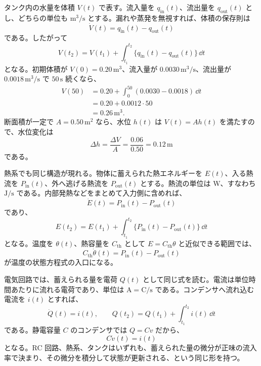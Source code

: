\begin{example}[タンクの体積保存]
タンク内の水量を体積 $V(t)$ で表す。流入量を $q_{\mathrm{in}}(t)$、流出量を $q_{\mathrm{out}}(t)$ とし、どちらの単位も $\mathrm{m^3/s}$ とする。漏れや蒸発を無視すれば、体積の保存則は
\begin{equation}
  \dot{V}(t)=q_{\mathrm{in}}(t)-q_{\mathrm{out}}(t)
\end{equation}
である。したがって
\begin{equation}
  V(t_2)=V(t_1)+
  \int_{t_1}^{t_2}
  \{q_{\mathrm{in}}(t)-q_{\mathrm{out}}(t)\}\,\dd t
\end{equation}
となる。初期体積が $V(0)=0.20\,\mathrm{m^3}$、流入量が $0.0030\,\mathrm{m^3/s}$、流出量が $0.0018\,\mathrm{m^3/s}$ で $50\,\mathrm{s}$ 続くなら、
\begin{align}
  V(50)
  &=0.20+\int_{0}^{50}(0.0030-0.0018)\,\dd t\\
  &=0.20+0.0012\cdot50\\
  &=0.26\,\mathrm{m^3}.
\end{align}
断面積が一定で $A=0.50\,\mathrm{m^2}$ なら、水位 $h(t)$ は $V(t)=Ah(t)$ を満たすので、水位変化は
\begin{equation}
  \Delta h=\frac{\Delta V}{A}
  =\frac{0.06}{0.50}
  =0.12\,\mathrm{m}
\end{equation}
である。
\end{example}

熱系でも同じ構造が現れる。物体に蓄えられた熱エネルギーを $E(t)$、入る熱流を $P_{\mathrm{in}}(t)$、外へ逃げる熱流を $P_{\mathrm{out}}(t)$ とする。熱流の単位は W、すなわち $\mathrm{J/s}$ である。内部発熱などをまとめて入力側に含めれば、
\begin{equation}
  \dot{E}(t)=P_{\mathrm{in}}(t)-P_{\mathrm{out}}(t)
\end{equation}
であり、
\begin{equation}
  E(t_2)=E(t_1)+
  \int_{t_1}^{t_2}
  \{P_{\mathrm{in}}(t)-P_{\mathrm{out}}(t)\}\,\dd t
\end{equation}
となる。温度を $\theta(t)$、熱容量を $C_{\mathrm{th}}$ として $E=C_{\mathrm{th}}\theta$ と近似できる範囲では、
\begin{equation}
  C_{\mathrm{th}}\dot{\theta}(t)
  =P_{\mathrm{in}}(t)-P_{\mathrm{out}}(t)
\end{equation}
が温度の状態方程式の入口になる。

電気回路では、蓄えられる量を電荷 $Q(t)$ として同じ式を読む。電流は単位時間あたりに流れる電荷であり、単位は $\mathrm{A}=\mathrm{C/s}$ である。コンデンサへ流れ込む電流を $i(t)$ とすれば、
\begin{equation}
  \dot{Q}(t)=i(t),
  \qquad
  Q(t_2)=Q(t_1)+\int_{t_1}^{t_2}i(t)\,\dd t
\end{equation}
である。静電容量 $C$ のコンデンサでは $Q=Cv$ だから、
\begin{equation}
  C\dot{v}(t)=i(t)
\end{equation}
となる。RC 回路、熱系、タンクはいずれも、蓄えられた量の微分が正味の流入率で決まり、その微分を積分して状態が更新される、という同じ形を持つ。

